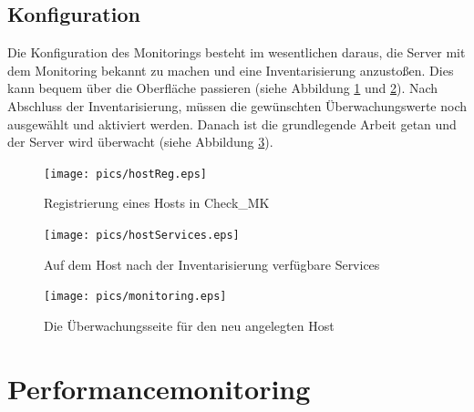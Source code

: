 \documentclass[12pt,a4paper,parskip,listof=totoc,bibliography=totoc]{scrreprt}
\begin{document}
	\subsection{Konfiguration}
	Die Konfiguration des Monitorings besteht im wesentlichen daraus, die Server mit dem Monitoring bekannt zu machen und eine Inventarisierung anzustoßen. Dies kann bequem über die Oberfläche passieren (siehe Abbildung \ref{fig:hostreg} und \ref{fig:hostservices}). Nach Abschluss der Inventarisierung, müssen die gewünschten Überwachungswerte noch ausgewählt und aktiviert werden. Danach ist die grundlegende Arbeit getan und der Server wird überwacht (siehe Abbildung \ref{fig:monitoring}).
	\begin{figure}[h!]
		\centering
		\texttt{[image: pics/hostReg.eps]}
		\caption[Registrierung eines Hosts]{Registrierung eines Hosts in Check\_MK}
		\label{fig:hostreg}
	\end{figure}
	\begin{figure}[h!]
		\centering
		\texttt{[image: pics/hostServices.eps]}
		\caption[Auf dem Host verfügbare Services]{Auf dem Host nach der Inventarisierung verfügbare Services}
		\label{fig:hostservices}
	\end{figure}
	\begin{figure}[h!]
		\centering
		\texttt{[image: pics/monitoring.eps]}
		\caption[Die Überwachungsseite für den neu angelegten Host]{Die Überwachungsseite für den neu angelegten Host}
		\label{fig:monitoring}
	\end{figure}
	\section{Performancemonitoring}
\end{document}
